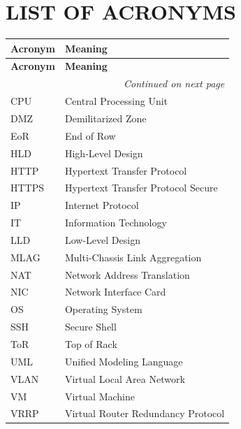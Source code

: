 \chapter*{LIST OF ACRONYMS}

\begin{longtable}{|p{}|p{}|}
\hline
\textbf{Acronym} & \textbf{Meaning} \\
\hline
\endfirsthead
\hline
\textbf{Acronym} & \textbf{Meaning} \\
\hline
\endhead
\hline
\multicolumn{2}{|r|}{\textit{Continued on next page}} \\
\endfoot
\hline
\endlastfoot

CPU & Central Processing Unit \\
DMZ & Demilitarized Zone \\
EoR & End of Row \\
HLD & High-Level Design \\
HTTP & Hypertext Transfer Protocol \\
HTTPS & Hypertext Transfer Protocol Secure \\
IP & Internet Protocol \\
IT & Information Technology \\
LLD & Low-Level Design \\
MLAG & Multi-Chassis Link Aggregation \\
NAT & Network Address Translation \\
NIC & Network Interface Card \\
OS & Operating System \\
SSH & Secure Shell \\
ToR & Top of Rack \\
UML & Unified Modeling Language \\
VLAN & Virtual Local Area Network \\
VM & Virtual Machine \\
VRRP & Virtual Router Redundancy Protocol \\

\end{longtable}
